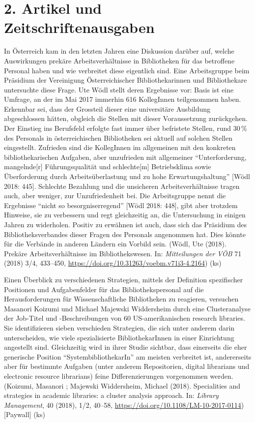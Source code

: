 \documentclass[a4paper,
fontsize=11pt,
oneside,
numbers=noperiodatend,
parskip=half-,
bibliography=totoc,
final
]{scrartcl}
\begin{document}
\hypertarget{artikel-und-zeitschriftenausgaben}{%
\section{2. Artikel und
Zeitschriftenausgaben}\label{artikel-und-zeitschriftenausgaben}}

In Österreich kam in den letzten Jahren eine Diskussion darüber auf,
welche Auswirkungen prekäre Arbeitsverhältnisse in Bibliotheken für das
betroffene Personal haben und wie verbreitet diese eigentlich sind. Eine
Arbeitsgruppe beim Präsidium der Vereinigung Österreichischer
Bibliothekarinnen und Bibliothekare untersuchte diese Frage. Ute Wödl
stellt deren Ergebnisse vor: Basis ist eine Umfrage, an der im Mai 2017
immerhin 616 KollegInnen teilgenommen haben. Erkennbar sei, dass der
Grossteil dieser eine universitäre Ausbildung abgeschlossen hätten,
obgleich die Stellen mit dieser Voraussetzung zurückgehen. Der Einstieg
ins Berufsfeld erfolgte fast immer über befristete Stellen, rund 30\,\%
des Personals in österreichischen Bibliotheken sei aktuell auf solchen
Stellen eingestellt. Zufrieden sind die KollegInnen im allgemeinen mit
den konkreten bibliothekarischen Aufgaben, aber unzufrieden mit
allgemeiner \enquote{Unterforderung, mangelnde{[}r{]} Führungsqualität
und schlechte{[}m{]} Betriebsklima sowie Überforderung durch
Arbeitsüberlastung und zu hohe Erwartungshaltung} {[}Wödl 2018: 445{]}.
Schlechte Bezahlung und die unsicheren Arbeitsverhältnisse tragen auch,
aber weniger, zur Unzufriedenheit bei. Die Arbeitsgruppe nennt die
Ergebnisse \enquote{nicht so besorgniserregend} {[}Wödl 2018: 448{]},
gibt aber trotzdem Hinweise, sie zu verbessern und regt gleichzeitig an,
die Untersuchung in einigen Jahren zu widerholen. Positiv zu erwähnen
ist auch, dass sich das Präsidium des Bibliotheksverbandes dieser Fragen
des Personals angenommen hat. Dies könnte für die Verbände in anderen
Ländern ein Vorbild sein. (Wödl, Ute (2018). Prekäre Arbeitsverhältnisse
im Bibliothekswesen. In: \emph{Mitteilungen der VÖB} 71 (2018) 3/4,
433--450, \url{https://doi.org/10.31263/voebm.v71i3-4.2164}) (ks)

Einen Überblick zu verschiedenen Strategien, mittels der Definition
spezifischer Positionen und Aufgabenfelder für das Bibliothekspersonal
auf die Herausforderungen für Wissenschaftliche Bibliotheken zu
reagieren, versuchen Masanori Koizumi und Michael Majewski Widdersheim
durch eine Clusteranalyse der Job-Titel und -Beschreibungen von 60
US-amerikanischen research libraries. Sie identifizieren sieben
verschieden Strategien, die sich unter anderem darin unterscheiden, wie
viele spezialisierte BibliothekarInnen in einer Einrichtung angestellt
sind. Gleichzeitig wird in ihrer Studie sichtbar, dass einerseits die
eher generische Position \enquote{SystembibliothekarIn} am meisten
verbreitet ist, andererseits aber für bestimmte Aufgaben (unter anderem
Repositorien, digital librarians und electronic resource librarians)
feine Differenzierungen vorgenommen werden. (Koizumi, Masanori ;
Majewski Widdersheim, Michael (2018). Specialities and strategies in
academic libraries: a cluster analysis approach. In: \emph{Library
Management}, 40 (2018), 1/2, 40--58,
\url{https://doi.org/10.1108/LM-10-2017-0114}) {[}Paywall{]} (ks)
\end{document}
